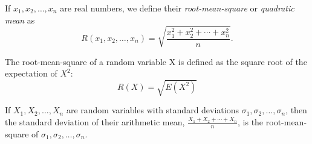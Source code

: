 \documentclass[12pt]{article}
\begin{document}
If $x_1,x_2,\ldots,x_n$ are real numbers, we define their
\emph{root-mean-square} or \emph{quadratic mean} as
$$
R(x_1,x_2,\ldots,x_n)=\sqrt{\frac{x_1^2+x_2^2+\cdots+x_n^2}{n}}.
$$

The root-mean-square of a random variable X is defined as the square
root of the expectation of $X^2$:
$$
R(X)=\sqrt{E(X^2)}
$$

If $X_1,X_2,\ldots,X_n$ are random variables with standard deviations
$\sigma_1,\sigma_2,\ldots,\sigma_n$, then the standard deviation of
their arithmetic mean, $\frac{X_1+X_2+\cdots+X_n}{n}$, is the
root-mean-square of $\sigma_1,\sigma_2,\ldots,\sigma_n$.
\end{document}
